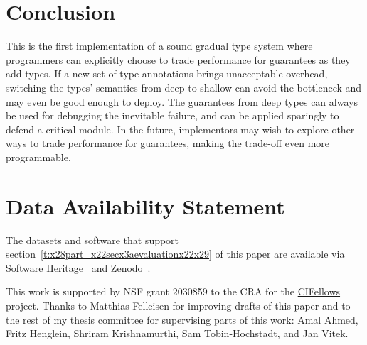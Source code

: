 \documentclass[screen=true, natbib=false, 10pt, sigplan]{acmart}
\newcommand{\sectionNewpage}{}
\newcommand{\postDoc}{}
\let\SOriginalthesubsection\thesubsection
\newcommand{\Ssection}[2]{\section[#1]{#2}\let\thesubsection\SOriginalthesubsection}
\begin{document}
\sectionNewpage

\Ssection{Conclusion}{Conclusion}\label{t:x28part_x22secx3aconclusionx22x29}

This is the first implementation of a sound gradual type system where
programmers can explicitly choose to trade performance for guarantees
as they add types.
If a new set of type annotations brings unacceptable overhead,
switching the types{'} semantics from deep to shallow
can avoid the bottleneck and may even be good enough to deploy.
The guarantees from deep types can always be used for debugging
the inevitable failure, and can be applied sparingly to defend
a critical module.
In the future, implementors may wish to explore other ways to trade
performance for guarantees, making the trade{-}off even more programmable.

\section*{Data Availability Statement}

The datasets and software that support
section~\ref{t:x28part_x22secx3aevaluationx22x29} of this paper
are available via Software Heritage~\cite{gpldi2022sh}
and Zenodo~\cite{gpldi2022z}.


\begin{acks}

This work is supported by NSF grant 2030859 to the CRA for the
\href{https://cifellows2020.org}{CIFellows} project.
Thanks to Matthias Felleisen for improving drafts of this paper and to
the rest of my thesis committee for supervising parts of this work:
Amal Ahmed,
Fritz Henglein,
Shriram Krishnamurthi,
Sam Tobin{-}Hochstadt,
and
Jan Vitek.

\end{acks}

\relax{\begingroup
\setlength{\emergencystretch}{8em}
\balance
\printbibliography
\endgroup}

\postDoc
\end{document}
